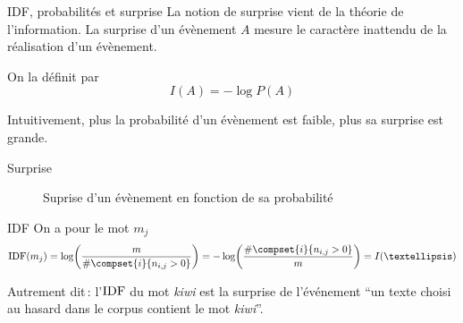 \documentclass[../allslides.tex]{subfiles}
\begin{document}
\begin{frame}{IDF, probabilités et surprise}
	La notion de \alert{surprise} vient de la théorie de l'information. La surprise d'un évènement \(A\) mesure le caractère inattendu de la réalisation d'un évènement.

	On la définit par
	\begin{equation}
		I(A) = -\log P(A)
	\end{equation}

	Intuitivement, plus la probabilité d'un évènement est faible, plus sa surprise est grande.
\end{frame}

\begin{frame}{Surprise}
	\begin{figure}
		\tikzset{external/export=true}
		\caption{Suprise d'un évènement en fonction de sa probabilité}
	\end{figure}
\end{frame}

\begin{frame}{IDF}
	On a pour le mot \(m_j\)
	\begin{equation}
		\IDF(m_j) = \log\mleft(\frac{m}{\#\compset{i}{n_{i,j}>0}}\mright) = -\log\mleft(\frac{\#\compset{i}{n_{i,j}>0}}{m}\mright) = I(…)
	\end{equation}

	Autrement dit : l'\(\operatorname{IDF}\) du mot \emph{kiwi} est la surprise de l'événement \enquote{un texte choisi au hasard dans le corpus contient le mot \emph{kiwi}}.
\end{frame}


\end{document}
